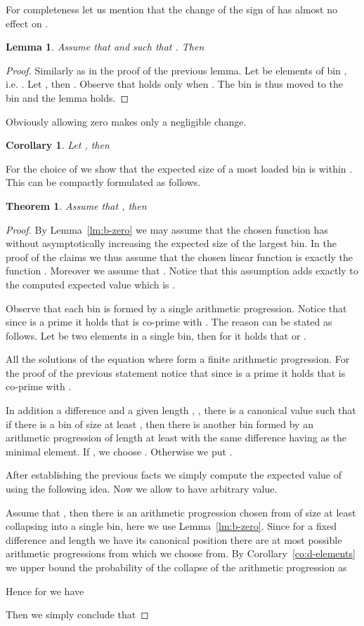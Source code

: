 \documentclass{article}
\newtheorem{lemma}{Lemma}
\newtheorem{theorem}{Theorem}
\newtheorem{corollary}{Corollary}
\begin{document}
For completeness let us mention that the change of the sign of  has almost no effect on .
\begin{lemma}
\label{lemma:sign-a}
Assume that   and  such that . Then 
\end{lemma}
\begin{proof}
Similarly as in the proof of the previous lemma. Let  be elements of bin , i.e. .
Let , then .
Observe that  holds only when .
The bin  is thus moved to the bin  and the lemma holds.
\end{proof}

Obviously allowing zero makes only a negligible change.
\begin{corollary}
Let , then

\end{corollary}

For the choice of  we show that the expected size of a most loaded bin is within . 
This can be compactly formulated as follows.
\begin{theorem}
\label{thm:interval-constant}
Assume that , then

\end{theorem}
\begin{proof}
By Lemma~\ref{lm:b-zero} we may assume that the chosen function has  without asymptotically increasing the expected size of the largest bin. In the proof of the claims we thus assume that the chosen linear function is exactly the function . Moreover we assume that . Notice that this assumption adds exactly  to the computed expected value which is .

Observe that each bin is formed by a single arithmetic progression. Notice that since  is a prime it holds that  is co-prime with .
The reason can be stated as follows.
Let  be two elements in a single bin, then for  it holds that  or .

All the solutions of the equation  where  form a finite arithmetic progression.
For the proof of the previous statement notice that since  is a prime it holds that  is co-prime with . 

In addition a difference  and a given length , , there is a canonical value  such that if there is a bin of size at least , then there is another bin formed by an arithmetic progression of length at least  with the same difference  having  as the minimal element. If , we choose . Otherwise we put .

After establishing the previous facts we simply compute the expected value of  using the following idea. Now we allow  to have arbitrary value.

Assume that , then there is an arithmetic progression chosen from  of size at least  collapsing into a single bin, here we use Lemma~\ref{lm:b-zero}. Since for a fixed difference and length we have its canonical position there are at most  possible arithmetic progressions from which we choose from. By Corollary~\ref{co:d-elements} we upper bound the probability of the collapse of the arithmetic progression as 



Hence for  we have


Then we simply conclude that


\end{proof}
\end{document}
